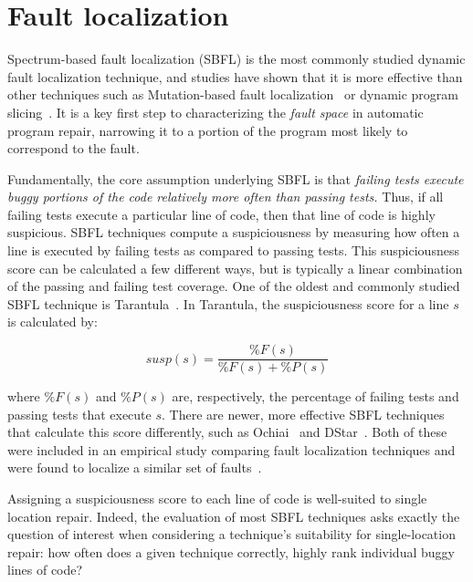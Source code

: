 \section{Fault localization} \label{secFL}



Spectrum-based fault localization (SBFL) is the most commonly studied dynamic
fault localization technique, and studies have shown that it is more effective
than other techniques such as Mutation-based fault
localization~\cite{mut-analysis} or dynamic program
slicing~\cite{zou2019empirical}. It is a key first step to characterizing the
\emph{fault space} in automatic program repair, narrowing it to a portion of the
program most likely to correspond to the fault.

Fundamentally, the core assumption underlying SBFL is that \emph{failing tests
  execute buggy portions of the code relatively more often than passing tests.}
Thus, if all failing tests execute a particular line of code, then that line of
code is highly suspicious.  SBFL techniques compute a suspiciousness by
measuring how often a line is executed by failing tests as compared to passing
tests. This suspiciousness score can be calculated a few different ways, but is
typically a linear combination of the passing and failing test coverage. One of
the oldest and commonly studied SBFL technique is Tarantula~\cite{tarantula}. In
Tarantula, the suspiciousness score for a line $s$ is calculated by:

$$\mathit{susp(s)} 
=\frac{\mathit{\%F(s)}}{\mathit{\%F(s)} + \mathit{\%P(s)}}$$

where  $\mathit{\%F(s)}$ and $\mathit{\%P(s)}$ are, respectively, the percentage of failing 
tests and passing tests that execute $s$. There are newer, more effective 
SBFL techniques that calculate this score differently, such as Ochiai~\cite{ochiai} and 
DStar~\cite{wong2013dstar}. Both of these were included in an empirical study 
comparing fault localization techniques and were found to localize a similar set of 
faults~\cite{zou2019empirical}.

Assigning a suspiciousness score to each line of code is well-suited to single
location repair. Indeed, the evaluation of most SBFL techniques asks exactly the
question of interest when considering a technique's suitability for
single-location repair: how often does a given technique correctly, highly rank
individual buggy lines of code?

